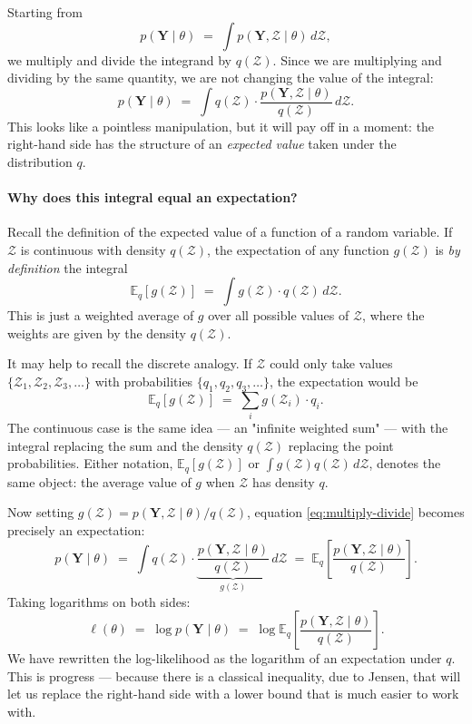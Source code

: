 \documentclass[11pt, a4paper, oneside]{article}
\newcommand{\mY}{\mathbf{Y}}
\begin{document}
Starting from
\[
p(\mY \mid \theta) \;=\; \int p(\mY, \mathcal{Z} \mid \theta)\, d\mathcal{Z},
\]
we multiply and divide the integrand by $q(\mathcal{Z})$. Since we are
multiplying and dividing by the same quantity, we are not changing the
value of the integral:
\begin{equation}
p(\mY \mid \theta) \;=\; \int q(\mathcal{Z}) \cdot \frac{p(\mY, \mathcal{Z} \mid \theta)}{q(\mathcal{Z})}\, d\mathcal{Z}.
\label{eq:multiply-divide}
\end{equation}
This looks like a pointless manipulation, but it will pay off in a
moment: the right-hand side has the structure of an \emph{expected value}
taken under the distribution $q$.

\paragraph{Why does this integral equal an expectation?}
Recall the definition of the expected value of a function of a random
variable. If $\mathcal{Z}$ is continuous with density $q(\mathcal{Z})$,
the expectation of any function $g(\mathcal{Z})$ is \emph{by definition}
the integral
\[
\mathbb{E}_q[g(\mathcal{Z})] \;=\; \int g(\mathcal{Z}) \cdot q(\mathcal{Z})\, d\mathcal{Z}.
\]
This is just a weighted average of $g$ over all possible values of
$\mathcal{Z}$, where the weights are given by the density $q(\mathcal{Z})$.

It may help to recall the discrete analogy. If $\mathcal{Z}$ could only
take values $\{\mathcal{Z}_1, \mathcal{Z}_2, \mathcal{Z}_3, \ldots\}$ with
probabilities $\{q_1, q_2, q_3, \ldots\}$, the expectation would be
\[
\mathbb{E}_q[g(\mathcal{Z})] \;=\; \sum_i g(\mathcal{Z}_i) \cdot q_i.
\]
The continuous case is the same idea — an "infinite weighted sum" — with
the integral replacing the sum and the density $q(\mathcal{Z})$ replacing
the point probabilities. Either notation,
$\mathbb{E}_q[g(\mathcal{Z})]$ or $\int g(\mathcal{Z}) q(\mathcal{Z})\, d\mathcal{Z}$,
denotes the same object: the average value of $g$ when $\mathcal{Z}$ has
density $q$.

\bigskip

Now setting $g(\mathcal{Z}) = p(\mY, \mathcal{Z} \mid \theta) / q(\mathcal{Z})$,
equation \eqref{eq:multiply-divide} becomes precisely an expectation:
\[
p(\mY \mid \theta)
\;=\; \int q(\mathcal{Z}) \cdot \underbrace{\frac{p(\mY, \mathcal{Z} \mid \theta)}{q(\mathcal{Z})}}_{g(\mathcal{Z})}\, d\mathcal{Z}
\;=\; \mathbb{E}_q\!\left[\frac{p(\mY, \mathcal{Z} \mid \theta)}{q(\mathcal{Z})}\right].
\]
Taking logarithms on both sides:
\begin{equation}
\ell(\theta) \;=\; \log p(\mY \mid \theta)
\;=\; \log \mathbb{E}_q\!\left[\frac{p(\mY, \mathcal{Z} \mid \theta)}{q(\mathcal{Z})}\right].
\label{eq:log-of-expectation}
\end{equation}
We have rewritten the log-likelihood as the logarithm of an expectation
under $q$. This is progress — because there is a classical inequality,
due to Jensen, that will let us replace the right-hand side with a
lower bound that is much easier to work with.
\end{document}
